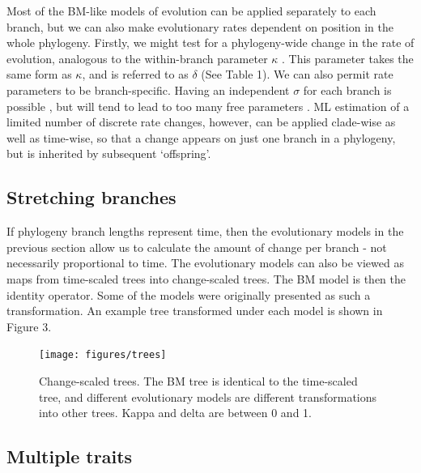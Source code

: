 \documentclass[12pt]{article}
\begin{document}
Most of the BM-like models of evolution can be applied separately to each branch, but we can also make evolutionary rates dependent on position in the whole phylogeny. 
Firstly, we might test for a phylogeny-wide change in the rate of evolution, analogous to the within-branch parameter $\kappa$ \citep{pagel_inferring_1997}. 
This parameter takes the same form as $\kappa$, and is referred to as $\delta$ \citep{thomas_motmot:_2012} (See Table 1). 
We can also permit rate parameters to be branch-specific. 
Having an independent $\sigma$ for each branch is possible \citep{mooers_using_1999}, but will tend to lead to too many free parameters \citep{thomas_motmot:_2012}. 
ML estimation of a limited number of discrete rate changes, however, can be applied clade-wise as well as time-wise, so that a change appears on just one branch in a phylogeny, but is inherited by subsequent `offspring'.

\subsection{Stretching branches}

If phylogeny branch lengths represent time, then the evolutionary models in the previous section allow us to calculate the amount of change per branch - not necessarily proportional to time. 
The evolutionary models can also be viewed as maps from time-scaled trees into change-scaled trees. 
The BM model is then the identity operator. 
Some of the models were originally presented as such a transformation. 
An example tree transformed under each model is shown in Figure 3.


\begin{figure}[!ht]
	\begin{center}
	\texttt{[image: figures/trees]}
	\end{center}
	\vspace{-40pt}	
	\caption{
		Change-scaled trees. The BM tree is identical to the time-scaled tree, and different evolutionary models are different transformations into other trees. Kappa and delta are between 0 and 1.
	}
	\label{Figure_label}
\end{figure}
\vspace{20pt}

\subsection{Multiple traits}
\end{document}
